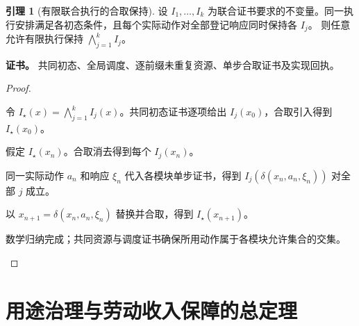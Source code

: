 \documentclass[UTF8,12pt,a4paper,openany,fontset=none,zihao=false]{ctexrep}
\theoremstyle{definition}
\newtheorem{lemma}{引理}[chapter]
\newenvironment{certificate}{\par\noindent\textbf{证书。}\ignorespaces}{\par}
\newcommand{\1}{\mathbf 1}
\begin{document}
\begin{lemma}[有限联合执行的合取保持]
\label{joint:preservation}
设 \(I_1,\ldots,I_k\) 为联合证书要求的不变量。同一执行安排满足各初态条件，且每个实际动作对全部登记响应同时保持各 \(I_j\)。
则任意允许有限执行保持 \(\bigwedge_{j=1}^kI_j\)。
\end{lemma}
\begin{certificate}
共同初态、全局调度、逐前缀未重复资源、单步合取证书及实现回执。
\end{certificate}
\begin{proof}
\begin{semanticsteps}
\item 令 \(I_\star(x)=\bigwedge_{j=1}^kI_j(x)\)。共同初态证书逐项给出 \(I_j(x_0)\)，合取引入得到 \(I_\star(x_0)\)。
\item 假定 \(I_\star(x_n)\)。合取消去得到每个 \(I_j(x_n)\)。
\item 同一实际动作 \(a_n\) 和响应 \(\xi_n\) 代入各模块单步证书，得到
\(I_j(\delta(x_n,a_n,\xi_n))\) 对全部 \(j\) 成立。
\item 以 \(x_{n+1}=\delta(x_n,a_n,\xi_n)\) 替换并合取，得到 \(I_\star(x_{n+1})\)。
\item 数学归纳完成；共同资源与调度证书确保所用动作属于各模块允许集合的交集。
\end{semanticsteps}
\end{proof}

\section{用途治理与劳动收入保障的总定理}
\end{document}
